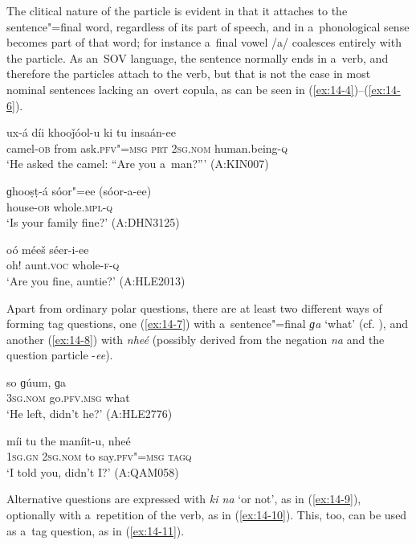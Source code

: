 The clitical nature of the particle is evident in that it attaches to the sentence"=final word, regardless of its part of speech, and in a~phonological sense becomes part of that word; for instance a~final vowel /a/ coalesces entirely with the particle. As an~SOV language, the sentence normally ends in a~verb, and therefore the particles attach to the verb, but that is not the case in most nominal sentences lacking an~overt copula, as can be seen in (\ref{ex:14-4})--(\ref{ex:14-6}).

\begin{exe}
\ex
\label{ex:14-4}
\gll ux-á díi khooǰóol-u ki tu insaán-ee \\
camel-\textsc{ob} from ask.\textsc{pfv"=msg} \textsc{prt} \textsc{2sg.nom} human.being-\textsc{q} \\
\glt `He asked the camel: ``Are you a~man?''' (A:KIN007)

\ex
\label{ex:14-5}
\gll ɡhooṣṭ-á sóor"=ee (sóor-a-ee) \\
house-\textsc{ob} whole.\textsc{mpl-q} \\
\glt `Is your family fine?' (A:DHN3125)

\ex
\label{ex:14-6}
\gll oó méeš séer-i-ee \\
oh! aunt.\textsc{voc} whole-\textsc{f-q} \\
\glt `Are you fine, auntie?' (A:HLE2013)
\end{exe}

Apart from ordinary polar questions, there are at least two different ways of forming tag questions, one (\ref{ex:14-7}) with a~sentence"=final \textit{ɡa} `what' (cf. ), and another (\ref{ex:14-8}) with \textit{nheé} (possibly derived from the negation \textit{na} and the question particle -\textit{ee}).

\begin{exe}
\ex
\label{ex:14-7}
\gll so ɡúum, ɡa \\
\textsc{3sg.nom} go.\textsc{pfv.msg} what \\
\glt `He left, didn't he?' (A:HLE2776)

\ex
\label{ex:14-8}
\gll míi tu the maníit-u, nheé \\
\textsc{1sg.gn} \textsc{2sg.nom} to say.\textsc{pfv"=msg} \textsc{tagq} \\
\glt `I told you, didn't I?' (A:QAM058)
\end{exe}

Alternative questions are expressed with \textit{ki na} `or not', as in (\ref{ex:14-9}), optionally with a~repetition of the verb, as in (\ref{ex:14-10}). This, too, can be used as a~tag question, as in (\ref{ex:14-11}).

